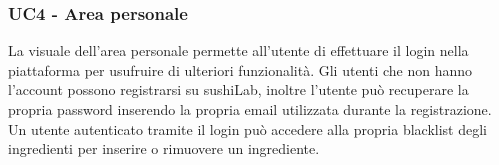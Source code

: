 \subsubsection{UC4 - Area personale}
La visuale dell'area personale permette all'utente di effettuare il login nella piattaforma per usufruire di ulteriori funzionalità. Gli utenti che non hanno l'account possono registrarsi su sushiLab, inoltre l'utente può recuperare la propria password inserendo la propria email utilizzata durante la registrazione. Un utente autenticato tramite il login può accedere alla propria blacklist degli ingredienti per inserire o rimuovere un ingrediente.
